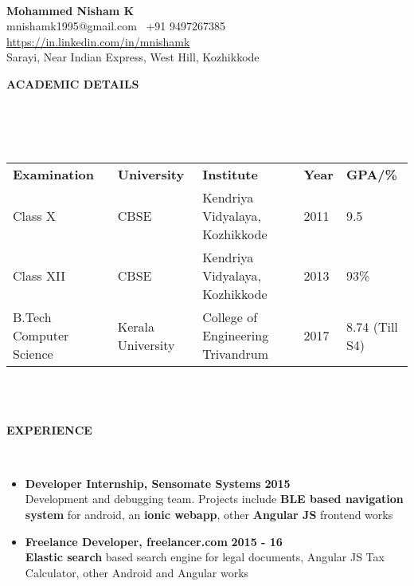 \documentclass[a4paper,10pt]{article}
\newcommand{\lsep}{-0.5cm}
\newcommand{\resheading}[1]{{\small \colorbox{mygrey}{\begin{minipage}{0.975\textwidth}{\textbf{\uppercase{#1} \vphantom{p\^{E}}}}\end{minipage}}}}
\newcommand{\when}[1]{\hfill \textbf{#1}}
\begin{document}
\hspace{0.5cm}\\[-0.2cm]

\begin{center}
\textbf{\Large{Mohammed Nisham K}} \\
mnishamk1995@gmail.com \textbullet\, +91 9497267385 \textbullet\, \href{https://in.linkedin.com/in/mnishamk}{https://in.linkedin.com/in/mnishamk}\\
Sarayi, Near Indian Express, West Hill, Kozhikkode \\
\end{center}

\resheading{\textbf{ACADEMIC DETAILS} }\\[\lsep]
\\ \\
\indent \begin{tabular}{ l @{\hskip 0.15in} l @{\hskip 0.15in} l @{\hskip 0.15in} l @{\hskip 0.15in} l }
\textbf{Examination} & \textbf{University} & \textbf{Institute} & \textbf{Year} & \textbf{GPA/\%} \\
Class X & CBSE & Kendriya Vidyalaya, Kozhikkode & 2011 & 9.5 \\
Class XII & CBSE & Kendriya Vidyalaya, Kozhikkode & 2013 & 93\% \\
B.Tech Computer Science & Kerala University & College of Engineering Trivandrum & 2017 & 8.74 (Till S4)\\
\end{tabular}
\\ \\

\resheading{\textbf{Experience} }\\[\lsep]
\begin{itemize}
\item \noindent \textbf{Developer Internship, Sensomate Systems} \when{2015}\\
	\indent Development and debugging team. Projects include \textbf{BLE based navigation system} for android, an \textbf{ionic webapp}, other \textbf{Angular JS} frontend works
\item \noindent \textbf{Freelance Developer, freelancer.com} \when{2015 - 16}\\
	\indent \textbf{Elastic search} based search engine for legal documents, Angular JS Tax Calculator, other Android and Angular works
\end{itemize}
\end{document}
